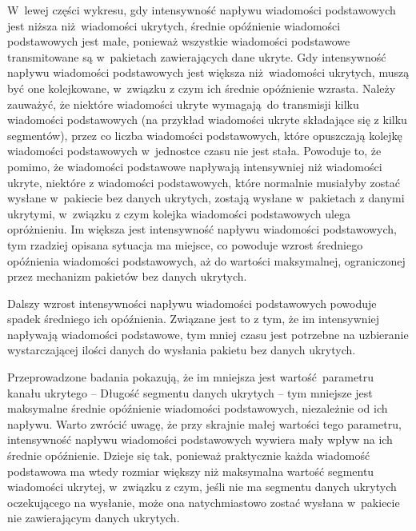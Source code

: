 \documentclass[a4paper, twoside, 12pt]{report}
\begin{document}
            W~lewej części wykresu, gdy intensywność napływu wiadomości podstawowych
            jest niższa niż wiadomości ukrytych, średnie opóźnienie wiadomości
            podstawowych jest małe, ponieważ wszystkie wiadomości podstawowe transmitowane
            są w~pakietach zawierających dane ukryte. Gdy intensywność napływu wiadomości
            podstawowych jest większa niż wiadomości ukrytych, muszą być one kolejkowane,
            w~związku z czym ich średnie opóźnienie wzrasta. Należy zauważyć, że
            niektóre wiadomości ukryte wymagają do transmisji kilku wiadomości
            podstawowych (na przykład wiadomości ukryte składające się z kilku segmentów),
            przez co liczba wiadomości podstawowych, które opuszczają kolejkę wiadomości
            podstawowych w~jednostce czasu nie jest stała. Powoduje to, że pomimo,
            że wiadomości podstawowe napływają intensywniej niż wiadomości ukryte,
            niektóre z wiadomości podstawowych, które normalnie musiałyby zostać
            wysłane w~pakiecie bez danych ukrytych, zostają wysłane w~pakietach
            z danymi ukrytymi, w~związku z czym kolejka wiadomości podstawowych
            ulega opróżnieniu. Im większa jest intensywność napływu wiadomości
            podstawowych, tym rzadziej opisana sytuacja ma miejsce, co powoduje
            wzrost średniego opóźnienia wiadomości podstawowych, aż do wartości
            maksymalnej, ograniczonej przez mechanizm pakietów bez danych ukrytych.

            Dalszy wzrost intensywności napływu wiadomości podstawowych powoduje
            spadek średniego ich opóźnienia. Związane jest to z tym, że im intensywniej
            napływają wiadomości podstawowe, tym mniej czasu jest potrzebne na uzbieranie
            wystarczającej ilości danych do wysłania pakietu bez danych ukrytych.

            Przeprowadzone badania pokazują, że im mniejsza jest wartość parametru
            kanału ukrytego -- Długość segmentu danych ukrytych -- tym mniejsze
            jest maksymalne średnie opóźnienie wiadomości podstawowych, niezależnie
            od ich napływu. Warto zwrócić uwagę, że przy skrajnie małej wartości tego
            parametru, intensywność napływu wiadomości podstawowych wywiera mały
            wpływ na ich średnie opóźnienie. Dzieje się tak, ponieważ praktycznie
            każda wiadomość podstawowa ma wtedy rozmiar większy niż maksymalna wartość
            segmentu wiadomości ukrytej, w~związku z czym, jeśli nie ma segmentu
            danych ukrytych oczekującego na wysłanie, może ona natychmiastowo
            zostać wysłana w~pakiecie nie zawierającym danych ukrytych.
\end{document}
